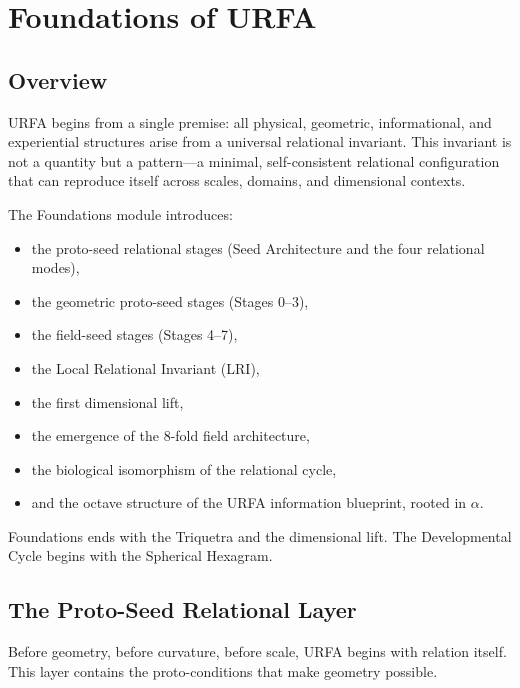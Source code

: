 
\section{Foundations of URFA}

\subsection{Overview}

URFA begins from a single premise: all physical, geometric, informational, and experiential structures arise from a universal relational invariant. This invariant is not a quantity but a pattern—a minimal, self-consistent relational configuration that can reproduce itself across scales, domains, and dimensional contexts.

The Foundations module introduces:
\begin{itemize}
    \item the proto-seed relational stages (Seed Architecture and the four relational modes),
    \item the geometric proto-seed stages (Stages 0–3),
    \item the field-seed stages (Stages 4–7),
    \item the Local Relational Invariant (LRI),
    \item the first dimensional lift,
    \item the emergence of the 8-fold field architecture,
    \item the biological isomorphism of the relational cycle,
    \item and the octave structure of the URFA information blueprint, rooted in $\alpha$.
\end{itemize}

Foundations ends with the Triquetra and the dimensional lift.  
The Developmental Cycle begins with the Spherical Hexagram.

\subsection{The Proto-Seed Relational Layer}

Before geometry, before curvature, before scale, URFA begins with relation itself.  
This layer contains the proto-conditions that make geometry possible.

